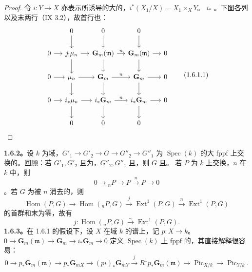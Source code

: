 \begin{proof}
令 $i:Y\to X$ 亦表示所诱导的大的，$i^*(X_1/X)=X_1\times_XY$。 $i_*$ 。下图各列以及末两行（IX 3.2），故首行也：
\[\begin{tikzcd}[column sep=small]
&0\arrow[d]&0\arrow[d]&0\arrow[d]\\
0\arrow[r]&j_!\mu_n\arrow[r]\arrow[d]&\mathbf G_m(\mathfrak m)\arrow[r,"n"]\arrow[d]&\mathbf G_m(\mathfrak m)\arrow[r]\arrow[d]&0\\
0\arrow[r]&\mu_n\arrow[r]\arrow[d]&\mathbf G_m\arrow[r,"n"]\arrow[d]&\mathbf G_m\arrow[r]\arrow[d]&0\\
0\arrow[r]&i_*\mu_n\arrow[r]\arrow[d]&i_*\mathbf G_m\arrow[r,"n"]\arrow[d]&i_*\mathbf G_m\arrow[r]\arrow[d]&0\\&0&0&0
\end{tikzcd}\tag{1.6.1.1}\]
\end{proof}
\textbf{1.6.2。}设 $k$ 为域，$G'_1\to G'_2\to G\to G''_2\to G''_1$ 为 $\operatorname{Spec}(k)$ 的大 fppf 上交换的。回顾：若 $G'_1,G'_2$ 且为，$G''_2,G''_1$ 且，则 $G$ 且。
若 $P$ 为 $k$ 上交换，$n$ 在 $k$ 中，则
\[0\to{}_nP\to P\xrightarrow nP\to0\tag{1.6.2.1}\]
。若 $G$ 为被 $n$ 消去的，则
\[\operatorname{Hom}(P,G)\to\operatorname{Hom}({}_nP,G)\xrightarrow j\operatorname{Ext}^1(P,G)\xrightarrow n\operatorname{Ext}^1(P,G)\]
的首群和末为零，故有
\[j:\operatorname{Hom}({}_nP,G)\xrightarrow\sim\operatorname{Ext}^1(P,G).\tag{1.6.2.2}\]
\textbf{1.6.3。}在 1.6.1 的假设下，设 $X$ 在域 $k$ 的谱上，记 $p:X\to k$。 $0\to\mathbf G_m(\mathfrak m)\to\mathbf G_m\to i_*\mathbf G_m\to0$ 定义 $\operatorname{Spec}(k)$ 上 fppf 的，其直接解释很容易：
\[0\to p_*\mathbf G_m(\mathfrak m)\to p_*\mathbf G_{mX}\to(pi)_*\mathbf G_{mY}\xrightarrow jR^1p_*\mathbf G_m(\mathfrak m)\to\operatorname{Pic}_{X/k}\to\operatorname{Pic}_{Y/k}.\tag{1.6.3.1}\]
